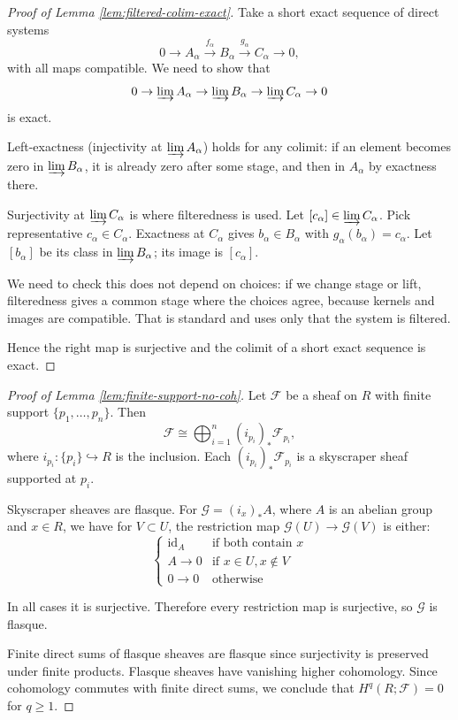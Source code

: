 \documentclass[12pt]{article}
\begin{document}
\begin{solution}
    \begin{proof}
    [Proof of Lemma \ref{lem:filtered-colim-exact}]
    Take a short exact sequence of direct systems
    \[
    0 \to A_\alpha \xrightarrow{f_\alpha} B_\alpha \xrightarrow{g_\alpha} C_\alpha \to 0,
    \]
    with all maps compatible. We need to show that
    \[
    0 \to \varinjlim A_\alpha \to \varinjlim B_\alpha \to \varinjlim C_\alpha \to 0
    \]
    is exact.

    Left-exactness (injectivity at $\varinjlim A_\alpha$) holds for any colimit: if an element becomes zero in $\varinjlim B_\alpha$, it is already zero after some stage, and then in $A_\alpha$ by exactness there.

    Surjectivity at $\varinjlim C_\alpha$ is where filteredness is used. Let $[c_\alpha] \in \varinjlim C_\alpha$. Pick representative $c_\alpha\in C_\alpha$. Exactness at $C_\alpha$ gives $b_\alpha\in B_\alpha$ with $g_\alpha(b_\alpha)=c_\alpha$. Let $[b_\alpha]$ be its class in $\varinjlim B_\alpha$; its image is $[c_\alpha]$. 

    We need to check this does not depend on choices: if we change stage or lift, filteredness gives a common stage where the choices agree, because kernels and images are compatible. That is standard and uses only that the system is filtered.

    Hence the right map is surjective and the colimit of a short exact sequence is exact.
    \end{proof}

    \begin{proof}[Proof of Lemma \ref{lem:finite-support-no-coh}]
    Let $\mathcal{F}$ be a sheaf on $R$ with finite support $\{p_1,\dots,p_n\}$. Then
    \[
    \mathcal{F} \cong \bigoplus_{i=1}^n (i_{p_i})_* \mathcal{F}_{p_i},
    \]
    where $i_{p_i} : \{p_i\} \hookrightarrow R$ is the inclusion. Each $(i_{p_i})_* \mathcal{F}_{p_i}$ is a skyscraper sheaf supported at $p_i$. 
    
Skyscraper sheaves are flasque. For $\mathcal{G} = (i_x)_*A$, where $A$ is an abelian group and $x\in R$, we have for $V\subset U$, the restriction map $\mathcal{G}(U)\to \mathcal{G}(V)$ is either:
    \[
    \begin{cases}
    \mathrm{id}_A & \text{if both contain }x \\
    A\to0 & \text{if }x\in U, x\notin V \\
    0\to0 & \text{otherwise}
    \end{cases}
    \]

    In all cases it is surjective. Therefore every restriction map is surjective, so $\mathcal{G}$ is flasque.

Finite direct sums of flasque sheaves are flasque since surjectivity is preserved under finite products. Flasque sheaves have vanishing higher cohomology.
Since cohomology commutes with finite direct sums, we conclude that $H^q(R;\mathcal{F})=0$ for $q\geq1$.
\end{proof}
\end{solution}
\end{document}
